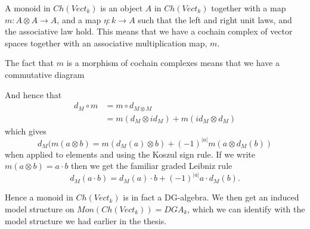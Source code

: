 A monoid in $Ch(Vect_k)$ is an object $A$ in $Ch(Vect_k)$ together with a map $m\colon A\otimes A\longrightarrow A$, and a map $\eta\colon k\longrightarrow A$ such that the left and right unit laws, and the associative law hold. This means that we have a cochain complex of vector spaces together with an associative multiplication map, $m$. 

The fact that $m$ is a morphism of cochain complexes means that we have a commutative diagram
\begin{center}
\end{center}
And hence that
\begin{align*}
    d_M\circ m
    &= m\circ d_{M\otimes M} \\
    &= m(d_M\otimes id_M) + m(id_M\otimes d_M)
\end{align*}
which gives 
\begin{equation*}
    d_M(m(a\otimes b) = m(d_M(a)\otimes b) + (-1)^{|a|}m(a\otimes d_M(b))
\end{equation*}
when applied to elements and using the Koszul sign rule. If we write $m(a\otimes b) = a\cdot b$ then we get the familiar graded Leibniz rule 
\begin{equation*}
    d_M(a\cdot b) = d_M(a)\cdot b + (-1)^{|a|}a\cdot d_M(b).
\end{equation*}

Hence a monoid in $Ch(Vect_k)$ is in fact a DG-algebra. We then get an induced model structure on $Mon(Ch(Vect_k)) = DGA_k$, which we can identify with the model structure we had earlier in the thesis.

